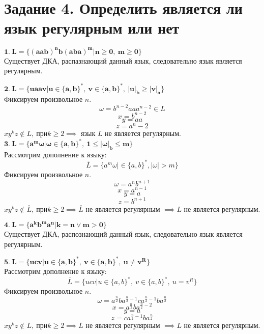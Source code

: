 \documentclass[12pt]{article}
\begin{document}
	\begin{center}
	\end{center}
	
	\section*{Задание 4. Определить является ли язык регулярным или нет}
	$\boldsymbol{1.\ L=\{(aab)^nb(aba)^m \vert n \geq 0,\ m \geq 0\}}$ \\
	Существует ДКА, распазнающий данный язык, следовательно язык является регулярным.
	\begin{center}
	\end{center}
	
	$\boldsymbol{2.\ L=\{uaav \vert u \in \{a,b\}^*,\ v \in \{a,b\}^*,\ |u|_b \geq |v|_a\}}$ \\
	Фиксируем произвольное $n$. \\
	$$\omega = b^{n-2}aaa^{n-2} \in L$$
	$$x = b^{n-2}$$ 
	$$y = aa$$  
	$$z = a^n-2$$ 
	$xy^kz \notin L,\ при k \geq 2 \implies $ язык $L$ не является регулярным. \\
	
	$\boldsymbol{3.\ L=\{a^m\omega \vert \omega \in \{a,b\}^*,\ 1 \leq |\omega|_b \leq m\}}$ \\
	Рассмотрим дополнение к языку:
	$$\overline{L} = \{a^m\omega \vert \in \{a,b\}^*, |\omega| > m\}$$
	Фиксируем произвольное $n$. \\
	$$\omega = a^nb^{n+1}$$
	$$x = a^{n-1}$$
	$$y = a$$
	$$z = b^{n+1}$$
	$xy^kz \notin \overline{L},\ при k \geq 2 \implies \overline{L}$ не является регулярным $\implies L$ не является регулярным.
	
	 $\boldsymbol{4.\ L = \{a^kb^ma^n \vert k=n \vee m > 0\}}$ \\
	 Существует ДКА, распознающий данный язык, следовательно язык является регулярным.
	 \begin{center}
	\end{center}
	
	$\boldsymbol{5.\ L = \{ucv \vert u \in \{a,b\}^*,\ v \in \{a,b\}^*,\ u \neq v^R\}}$ \\
	Рассмотрим дополнение к языку:
	$$\overline{L} = \{ucv \vert u \in \{a,b\}^*,\ v \in \{a,b\}^*,\ u = v^R\}$$
	Фиксируем произвольное $n$. \\
	$$\omega = a^{\frac{n}{2}} b a^{\frac{n}{2}-1} c a^{\frac{n}{2}-1} b a^{\frac{n}{2}}$$
	$$x = a^{\frac{n}{2}}ba^{\frac{n}{2}-2}$$
	$$y = a$$
	$$z = ca^{\frac{n}{2}-1}ba^{\frac{n}{2}}$$
	$xy^kz \notin \overline{L},\ при k \geq 2 \implies \overline{L}$ не является регулярным $\implies L$ не является регулярным. 
\end{document}
